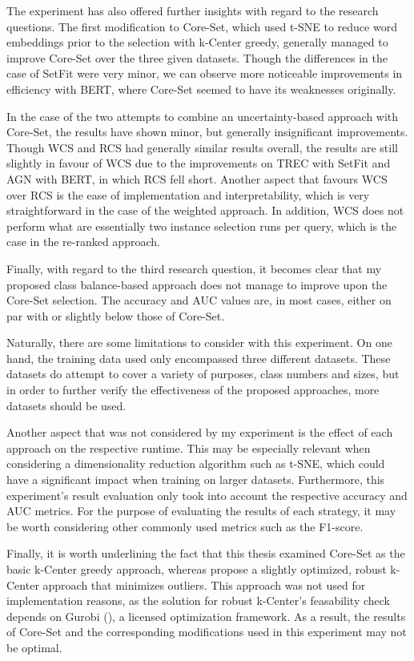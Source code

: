 \documentclass[english,bachelor,ul]{webisthesis} %
\begin{document}
The experiment has also offered further insights with regard to the research questions. The first modification to Core-Set, which used t-SNE to reduce word embeddings prior to the selection with k-Center greedy, generally managed to improve Core-Set over the three given datasets. Though the differences in the case of SetFit were very minor, we can observe more noticeable improvements in efficiency with BERT, where Core-Set seemed to have its weaknesses originally.  

In the case of the two attempts to combine an uncertainty-based approach with Core-Set, the results have shown minor, but generally insignificant improvements. Though WCS and RCS had generally similar results overall, the results are still slightly in favour of WCS due to the improvements on TREC with SetFit and AGN with BERT, in which RCS fell short. Another aspect that favours WCS over RCS is the ease of implementation and interpretability, which is very straightforward in the case of the weighted approach. In addition, WCS does not perform what are essentially two instance selection runs per query, which is the case in the re-ranked approach.

Finally, with regard to the third research question, it becomes clear that my proposed class balance-based approach does not manage to improve upon the Core-Set selection. The accuracy and AUC values are, in most cases, either on par with or slightly below those of Core-Set. 

Naturally, there are some limitations to consider with this experiment. On one hand, the training data used only encompassed three different datasets. These datasets do attempt to cover a variety of purposes, class numbers and sizes, but in order to further verify the effectiveness of the proposed approaches, more datasets should be used. 

Another aspect that was not considered by my experiment is the effect of each approach on the respective runtime. This may be especially relevant when considering a dimensionality reduction algorithm such as t-SNE, which could have a significant impact when training on larger datasets. Furthermore, this experiment's result evaluation only took into account the respective accuracy and AUC metrics. For the purpose of evaluating the results of each strategy, it may be worth considering other commonly used metrics such as the F1-score.

Finally, it is worth underlining the fact that this thesis examined Core-Set as the basic k-Center greedy approach, whereas \cite{DBLP:conf/iclr/SenerS18} propose a slightly optimized, robust k-Center approach that minimizes outliers. This approach was not used for implementation reasons, as the solution for robust k-Center's feasability check depends on Gurobi (\cite{gurobi}), a licensed optimization framework. As a result, the results of Core-Set and the corresponding modifications used in this experiment may not be optimal.
\end{document}

